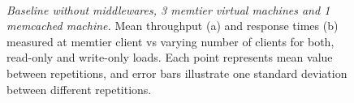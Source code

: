 \documentclass[11pt,a4paper]{article}
\begin{document}
\begin{figure}[ht!]
	\hfill
	\\
	\caption{\textit{Baseline without middlewares, 3 memtier virtual machines and 1 memcached machine.} Mean throughput (a) and response times (b) measured at memtier client vs varying number of clients for both, read-only and write-only loads. Each point represents mean value between repetitions, and error bars illustrate one standard deviation between different repetitions.}
	\label{Figure:baseline_nomidd_1server} 	
\end{figure}
\end{document}
